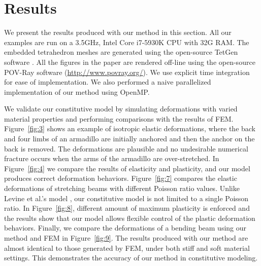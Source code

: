 \section{Results}

We present the results produced with our method in this section. All our examples are run on a 3.5GHz, Intel Core i7-5930K CPU with 32G RAM. The embedded tetrahedron meshes are generated using the open-source TetGen software \cite{Si:2015:TDQ:2732672.2629697}. All the figures in the paper are rendered off-line using the open-source POV-Ray software (\url{http://www.povray.org/}). We use explicit time integration for ease of implementation. We also performed a naive parallelized implementation of our method using OpenMP.

 We validate our constitutive model by simulating deformations with varied material properties and performing comparisons with the results of FEM. Figure~\ref{fig:3} shows an example of isotropic elastic deformations, where the back and four limbs of an armadillo are initially anchored and then the anchor on the back is removed. The deformations are plausible and no undesirable numerical fracture occurs when the arms of the armadillo are over-stretched. In Figure~\ref{fig:4} we compare the results of elasticity and plasticity, and our model produces correct deformation behaviors. Figure~\ref{fig:7} compares the elastic deformations of stretching beams with different Poisson ratio values. Unlike Levine et al.'s model \cite{Levine:2015:PPS:2849517.2849526}, our constitutive model is not limited to a single Poisson ratio. In Figure~\ref{fig:8}, different amount of maximum plasticity is enforced and the results show that our model allows flexible control of the plastic deformation behaviors. Finally, we compare the deformations of a bending beam using our method and FEM in Figure~\ref{fig:9}. The results produced with our method are almost identical to those generated by FEM, under both stiff and soft material settings. This demonstrates the accuracy of our method in constitutive modeling.

